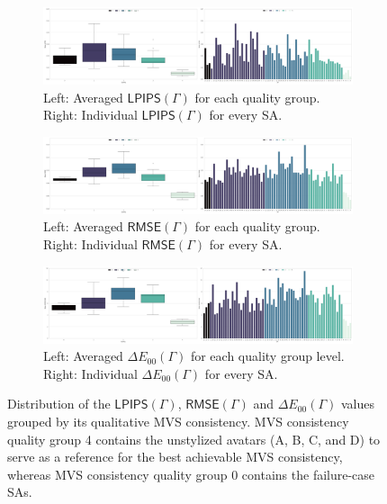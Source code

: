 \begin{figure}[ht]
	\centering
	\begin{subfigure}{0.95\linewidth}
		\includegraphics[width=0.95\linewidth]{Figures/results/LPIPS_all.png}
		\caption{Left: Averaged $\mathsf{LPIPS}(\varGamma)$ for each quality group. Right: Individual $\mathsf{LPIPS}(\varGamma)$ for every SA.}
		\label{fig:lpips_all}
	\end{subfigure}
	\begin{subfigure}{0.95\linewidth}
		\includegraphics[width=0.95\linewidth]{Figures/results/RMSE_all.png}
		\caption{Left: Averaged $\mathsf{RMSE}(\varGamma)$ for each quality group. Right: Individual $\mathsf{RMSE}(\varGamma)$ for every SA.}
		\label{fig:rmse_all}
	\end{subfigure}
	\begin{subfigure}{0.95\linewidth}
		\includegraphics[width=0.95\linewidth]{Figures/results/CIEDE2000_all.png}
		\caption{Left: Averaged $\Delta E_{00}(\varGamma)$ for each quality group level. Right: Individual $\Delta E_{00}(\varGamma)$ for every SA.}
		\label{fig:ciede2000_all}
	\end{subfigure}
	\caption{Distribution of the $\mathsf{LPIPS}(\varGamma)$, $\mathsf{RMSE}(\varGamma)$ and $\Delta E_{00}(\varGamma)$ values grouped by its qualitative MVS consistency. MVS consistency quality group 4 contains the unstylized avatars (A, B, C, and D) to serve as a reference for the best achievable MVS consistency, whereas MVS consistency quality group 0 contains the failure-case SAs.}
	\label{fig:quantitative_distribution_all}
\end{figure}

